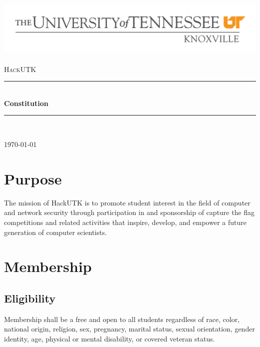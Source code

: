 \documentclass[12pt]{article}
\newcommand{\HRule}{\rule{\linewidth}{0.5mm}}
\begin{document}
\begin{titlepage}
\begin{center}

\includegraphics[width=1\textwidth]{utlogo2-large.png}~\\[1cm]


\textsc{\Large HackUTK}\\[0.5cm]

\HRule \\[0.4cm]
{ \huge \bfseries Constitution \\[0.4cm] }

\HRule \\[1.5cm]


\vfill

{\large \today}

\end{center}
\end{titlepage}

\section{Purpose}
The mission of HackUTK is to promote student interest in the field of computer and network security through participation in and sponsorship of capture the flag competitions and related activities that inspire, develop, and empower a future generation of computer scientists.

\section{Membership}
\subsection{Eligibility}
Membership shall be a free and open to all students regardless of race, color, national origin, religion, sex, pregnancy, marital status, sexual orientation, gender identity, age, physical or mental disability, or covered veteran status.
\end{document}
